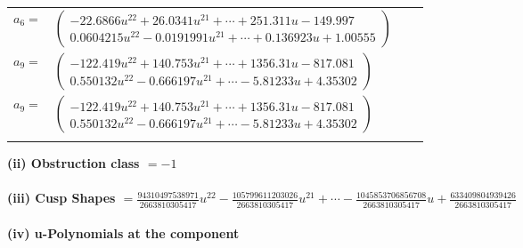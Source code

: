 \documentclass[1p]{elsarticle_modified}
\theoremstyle{definition}
\begin{document}
\begin{tabular}{m{7pt} m{180pt} m{7pt} m{180pt} }
\flushright $a_{6}=$&$\begin{pmatrix}-22.6866 u^{22}+26.0341 u^{21}+\cdots+251.311 u-149.997\\0.0604215 u^{22}-0.0191991 u^{21}+\cdots+0.136923 u+1.00555\end{pmatrix}$ \\
\flushright $a_{9}=$&$\begin{pmatrix}-122.419 u^{22}+140.753 u^{21}+\cdots+1356.31 u-817.081\\0.550132 u^{22}-0.666197 u^{21}+\cdots-5.81233 u+4.35302\end{pmatrix}$\\ \flushright $a_{9}=$&$\begin{pmatrix}-122.419 u^{22}+140.753 u^{21}+\cdots+1356.31 u-817.081\\0.550132 u^{22}-0.666197 u^{21}+\cdots-5.81233 u+4.35302\end{pmatrix}$\\&\end{tabular}
\flushleft \textbf{(ii) Obstruction class $= -1$}\\~\\
\flushleft \textbf{(iii) Cusp Shapes $= \frac{94310497538971}{2663810305417} u^{22}-\frac{105799611203026}{2663810305417} u^{21}+\cdots-\frac{1045853706856708}{2663810305417} u+\frac{633409804939426}{2663810305417}$}\\~\\
\newpage\renewcommand{\arraystretch}{1}
\flushleft \textbf{(iv) u-Polynomials at the component}\newline \\
\end{document}
